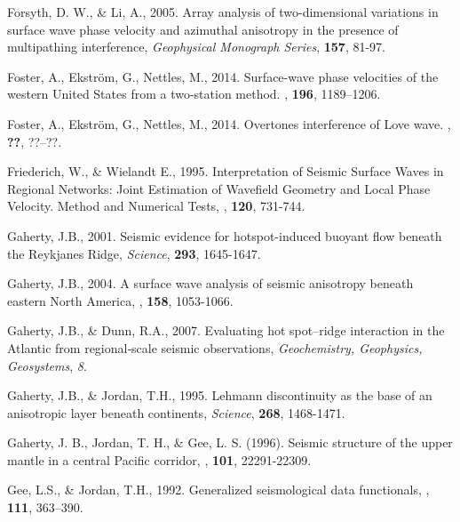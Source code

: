 \documentclass[referee]{gji}
\begin{document}
\begin{thebibliography}{}
	   Forsyth, D. W., \& Li, A., 2005. Array analysis of two-dimensional variations in surface wave phase velocity and azimuthal anisotropy in the presence of multipathing interference, \textit{Geophysical Monograph Series}, \textbf{157}, 81-97.

	   Foster, A., Ekstr\"{o}m, G., Nettles, M., 2014. Surface-wave phase velocities of the western United States from a two-station method. \textit{\gji}, \textbf{196}, 1189–1206.

	   Foster, A., Ekstr\"{o}m, G., Nettles, M., 2014. Overtones interference of Love wave. \textit{}, \textbf{??}, ??–??.

   Friederich, W., \& Wielandt E., 1995. Interpretation of Seismic Surface Waves in Regional Networks: Joint Estimation of Wavefield Geometry and Local Phase Velocity. Method and Numerical Tests, \textit{\gjras}, \textbf{120}, 731-744.

	   Gaherty, J.B., 2001. Seismic evidence for hotspot-induced buoyant flow beneath the Reykjanes Ridge, \textit{Science}, \textbf{293}, 1645-1647.

	   Gaherty, J.B., 2004. A surface wave analysis of seismic anisotropy beneath eastern North America, \textbf{\gji}, \textbf{158}, 1053-1066.

	   Gaherty, J.B., \& Dunn, R.A., 2007. Evaluating hot spot–ridge interaction in the Atlantic from regional‐scale seismic observations, \textit{Geochemistry, Geophysics, Geosystems}, \textit{8}.

	   Gaherty, J.B., \& Jordan, T.H., 1995. Lehmann discontinuity as the base of an anisotropic layer beneath continents, \textit{Science}, \textbf{268}, 1468-1471.

	   Gaherty, J. B., Jordan, T. H., \& Gee, L. S. (1996). Seismic structure of the upper mantle in a central Pacific corridor, \textit{\jgr}, \textbf{101}, 22291-22309.

	   Gee, L.S., \& Jordan, T.H., 1992. Generalized seismological data functionals, \textit{\gji}, \textbf{111}, 363–390.


\end{thebibliography}
\end{document}
